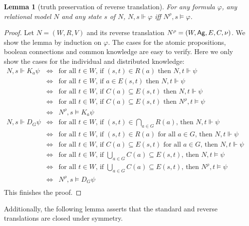\documentclass{article}
\newtheorem{lemma}[theorem]{Lemma}%
\newcommand{\ag}{\text{\normalfont\textsf{Ag}}\xspace}
\renewcommand{\phi}{\varphi}
\begin{document}
\begin{lemma}[truth preservation of reverse translation]\label{lem:trans-w}
For any formula $\phi$, any relational model $N$ and any state $s$ of $N$, $N,s \Vdash \phi$ iff $N^\rho,s \models \phi$.
\end{lemma}
\begin{proof}
Let $N = (W,R,V)$ and its reverse translation $N^\rho = (W,\ag,E,C,\nu)$. We show the lemma by induction on $\phi$. The cases for the atomic propositions, boolean connections and common knowledge are easy to verify. Here we only show the cases for the individual and distributed knowledge:
\[
\begin{array}{rcll}
N,s \Vdash K_a\psi & \iff & \text{for all $t \in W$, if $(s,t) \in R(a)$ then $N,t \Vdash \psi$}& \\
& \iff & \text{for all $t \in W$, if $a \in E(s,t)$ then $N,t \Vdash \psi$} & \\
& \iff &  \text{for all $t \in W$, if $C(a) \subseteq E(s,t)$ then $N,t \Vdash \psi$} & \\
& \iff & \text{for all $t \in W$, if $C(a) \subseteq E(s,t)$ then $N^\rho,t \models \psi$} &\\
& \iff & N^\rho,s \models K_a\psi &\\[1em]
%
N,s \Vdash D_G\psi & \iff & \text{for all $t \in W$, if $(s,t) \in \bigcap_{a \in G} R(a)$, then $N,t \Vdash \psi$}& \\
& \iff & \text{for all $t\in W$, if $(s,t) \in R(a)$ for all $a\in G$, then $N,t \Vdash \psi$} & \\
& \iff & \text{for all $t\in W$, if $C(a)\subseteq E(s,t)$ for all $a\in G$, then $N,t \Vdash \psi$} & \\
& \iff & \text{for all $t\in W$, if $\bigcup_{a \in G} C(a)\subseteq E(s,t)$, then $N,t \models \psi$} &\\
& \iff & \text{for all $t\in W$, if $\bigcup_{a \in G} C(a)\subseteq E(s,t)$, then $N^\rho,t \models \psi$} &\\
& \iff & N^\rho,s \models D_G\psi &\\
\end{array}
\]
This finishes the proof.
\end{proof}

Additionally, the following lemma asserts that the standard and reverse translations are closed under symmetry.
\end{document}
